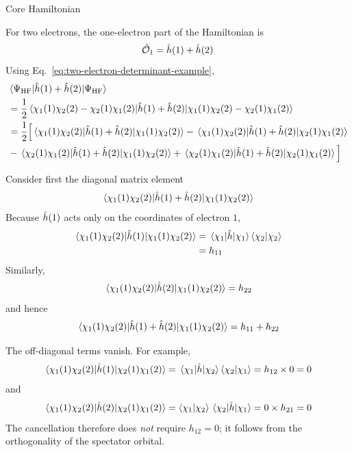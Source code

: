 \documentclass[11pt,a4paper,titlepage]{article}
\numberwithin{equation}{section}
\newcommand{\hh}{\Hat{h}}
\newcommand{\chO}{\Hat{\mathcal{O}}}
\begin{document}
\begin{hfsolution}{Core Hamiltonian}

For two electrons, the one-electron part of the Hamiltonian is
\begin{equation}
  \chO_1
  =
  \hh(1)+\hh(2)
\end{equation}
Using Eq.~\eqref{eq:two-electron-determinant-example},
\begin{equation}
\begin{split}
  &
  \mel{\Psi_\text{HF}}
      {\hh(1)+\hh(2)}
      {\Psi_\text{HF}}
  \\
  &=
  \frac{1}{2}
  \mel{
    \chi_1(1)\chi_2(2)-\chi_2(1)\chi_1(2)
  }
  {\hh(1)+\hh(2)}
  {
    \chi_1(1)\chi_2(2)-\chi_2(1)\chi_1(2)
  }
  \\
  &=
  \frac{1}{2}
  \Big[
  \mel{\chi_1(1)\chi_2(2)}
      {\hh(1)+\hh(2)}
      {\chi_1(1)\chi_2(2)}
  -
  \mel{\chi_1(1)\chi_2(2)}
      {\hh(1)+\hh(2)}
      {\chi_2(1)\chi_1(2)}
  \\
  &-
  \mel{\chi_2(1)\chi_1(2)}
      {\hh(1)+\hh(2)}
      {\chi_1(1)\chi_2(2)}
  +
  \mel{\chi_2(1)\chi_1(2)}
      {\hh(1)+\hh(2)}
      {\chi_2(1)\chi_1(2)}
  \Big]
  \label{eq:core-two-electron-expansion}
\end{split}
\end{equation}

Consider first the diagonal matrix element
\begin{equation}
  \mel{\chi_1(1)\chi_2(2)}
      {\hh(1)+\hh(2)}
      {\chi_1(1)\chi_2(2)}
\end{equation}
Because $\hh(1)$ acts only on the coordinates of electron $1$,
\begin{equation}
\begin{split}
  \mel{\chi_1(1)\chi_2(2)}
      {\hh(1)}
      {\chi_1(1)\chi_2(2)}
  &=
  \mel{\chi_1}{\hh}{\chi_1}
  \braket{\chi_2}{\chi_2}
  \\
  &=h_{11}
\end{split}
\end{equation}
Similarly,
\begin{equation}
  \mel{\chi_1(1)\chi_2(2)}
      {\hh(2)}
      {\chi_1(1)\chi_2(2)}
  =
  h_{22}
\end{equation}
and hence
\begin{equation}
  \mel{\chi_1(1)\chi_2(2)}
      {\hh(1)+\hh(2)}
      {\chi_1(1)\chi_2(2)}
  =
  h_{11}+h_{22}
\end{equation}

The off-diagonal terms vanish. For example,
\begin{equation}
  \mel{\chi_1(1)\chi_2(2)}
      {\hh(1)}
      {\chi_2(1)\chi_1(2)}
  =
  \mel{\chi_1}{\hh}{\chi_2}
  \braket{\chi_2}{\chi_1}
  =
  h_{12}\times 0
  =
  0
\end{equation}
and
\begin{equation}
  \mel{\chi_1(1)\chi_2(2)}
      {\hh(2)}
      {\chi_2(1)\chi_1(2)}
  =
  \braket{\chi_1}{\chi_2}
  \mel{\chi_2}{\hh}{\chi_1}
  =
  0\times h_{21}
  =
  0
\end{equation}
The cancellation therefore does \emph{not} require $h_{12}=0$; it follows
from the orthogonality of the spectator orbital.


\end{hfsolution}
\end{document}
